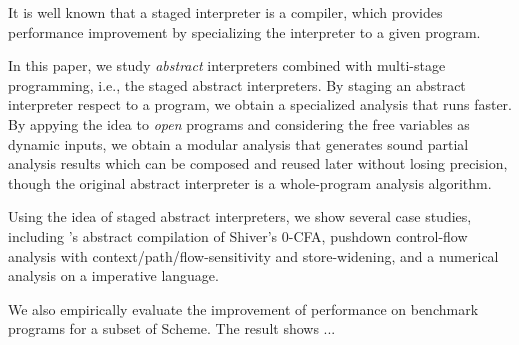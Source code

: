 It is well known that a staged interpreter is a compiler, which provides performance improvement
by specializing the interpreter to a given program.

In this paper, we study \textit{abstract} interpreters combined with multi-stage programming, i.e., the 
staged abstract interpreters. 
By staging an abstract interpreter respect to a program, we obtain a specialized analysis that runs faster.
By appying the idea to \textit{open} programs and considering the free variables as dynamic inputs, 
we obtain a modular analysis that generates sound partial analysis results which can be composed 
and reused later without losing precision, though the original abstract interpreter is a whole-program 
analysis algorithm.

Using the idea of staged abstract interpreters, we show several case studies, including 
\citeauthor{Boucher:1996:ACN:647473.727587}'s abstract compilation of Shiver's 0-CFA, pushdown
control-flow analysis with context/path/flow-sensitivity and store-widening, and a numerical
analysis on a imperative language.

We also empirically evaluate the improvement of performance on benchmark programs for a subset of Scheme.
The result shows ...

